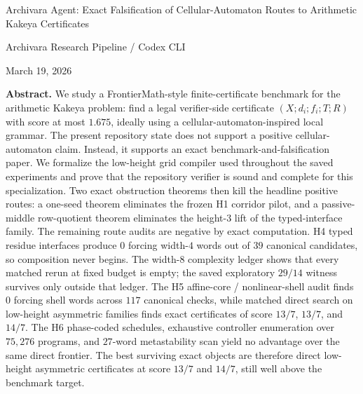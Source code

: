 \documentclass[11pt]{article}
\theoremstyle{definition}
\begin{document}
\hypersetup{pageanchor=false}
\begin{titlepage}
  \centering
  {\Large Archivara Agent: Exact Falsification of Cellular-Automaton Routes to Arithmetic Kakeya Certificates\par}
  \vspace{1.2cm}
  {\large Archivara Research Pipeline / Codex CLI\par}
  \vspace{0.4cm}
  {\large March 19, 2026\par}
  \vfill
  \begin{minipage}{0.92\textwidth}
  \textbf{Abstract.}
  We study a FrontierMath-style finite-certificate benchmark for the arithmetic Kakeya problem: find a legal verifier-side certificate $(X;d_i;f_i;T;R)$ with score at most $1.675$, ideally using a cellular-automaton-inspired local grammar. The present repository state does not support a positive cellular-automaton claim. Instead, it supports an exact benchmark-and-falsification paper. We formalize the low-height grid compiler used throughout the saved experiments and prove that the repository verifier is sound and complete for this specialization. Two exact obstruction theorems then kill the headline positive routes: a one-seed theorem eliminates the frozen \textsc{H1} corridor pilot, and a passive-middle row-quotient theorem eliminates the height-$3$ lift of the typed-interface family. The remaining route audits are negative by exact computation. \textsc{H4} typed residue interfaces produce $0$ forcing width-$4$ words out of $39$ canonical candidates, so composition never begins. The width-$8$ complexity ledger shows that every matched rerun at fixed budget is empty; the saved exploratory $29/14$ witness survives only outside that ledger. The \textsc{H5} affine-core / nonlinear-shell audit finds $0$ forcing shell words across $117$ canonical checks, while matched direct search on low-height asymmetric families finds exact certificates of score $13/7$, $13/7$, and $14/7$. The \textsc{H6} phase-coded schedules, exhaustive controller enumeration over $75{,}276$ programs, and $27$-word metastability scan yield no advantage over the same direct frontier. The best surviving exact objects are therefore direct low-height asymmetric certificates at score $13/7$ and $14/7$, still well above the benchmark target. 
  \end{minipage}
  \vfill
\end{titlepage}

\tableofcontents
\newpage
\hypersetup{pageanchor=true}
\setcounter{page}{1}
\end{document}
